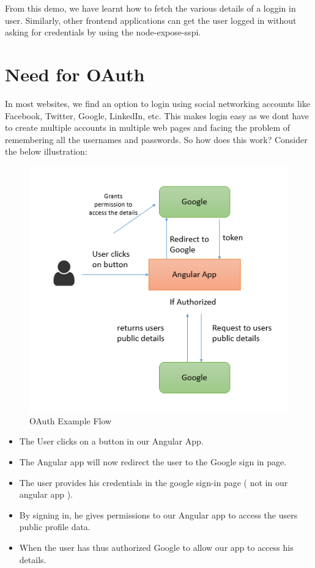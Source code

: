 \documentclass{report}
\begin{document}
From this demo, we have learnt how to fetch the various details of a loggin in user. Similarly, other frontend applications can get the user logged in without asking for credentials by using the node-expose-sspi.

\section{Need for OAuth}
In most websites, we find an option to login using social networking accounts like Facebook, Twitter, Google, LinkedIn, etc. This makes login easy as we dont have to create multiple accounts in multiple web pages and facing the problem of remembering all the usernames and passwords. So how does this work?
Consider the below illustration:
\begin{figure}[h]
	\centerline{\includegraphics{oAuth.png}}
	\caption{OAuth Example Flow}
	\label{OAuth Example Flow}
\end{figure}

\begin{itemize}
	\item{The User clicks on a button in our Angular App.}
	\item{The Angular app will now redirect the user to the Google sign in page.}
	\item{The user provides his credentials in the google sign-in page ( not in our angular app ). }
	\item{By signing in, he gives permissions to our Angular app to access the users public profile data.}
	\item{When the user has thus authorized Google to allow our app to access his details.}
\end{itemize}
\end{document}
